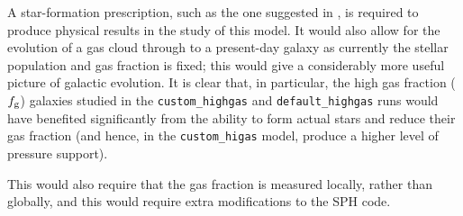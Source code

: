A star-formation prescription, such as the one suggested in \citet{tasker_simulating_2006}, is required to produce physical results in the study of this model.
It would also allow for the evolution of a gas cloud through to a present-day galaxy as currently the stellar population and gas fraction is fixed; this would give a considerably more useful picture of galactic evolution.
It is clear that, in particular, the high gas fraction ($f_\mathrm{g}$) galaxies studied in the {\tt custom\_highgas} and {\tt default\_highgas} runs would have benefited significantly from the ability to form actual stars and reduce their gas fraction (and hence, in the {\tt custom\_higas} model, produce a higher level of pressure support).

This would also require that the gas fraction is measured locally, rather than globally, and this would require extra modifications to the SPH code.

